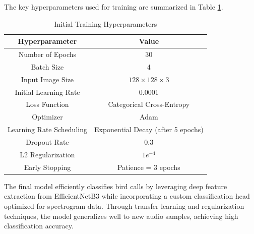 \begin{itemize}
            The key hyperparameters used for training are summarized in Table \ref{tab:training_hyperparameters}.
            \begin{table}[h]
                  \centering
                  \caption{Initial Training Hyperparameters}
                  \label{tab:training_hyperparameters}
                  \begin{tabular}{|c|c|}
                  \hline
                  \textbf{Hyperparameter} & \textbf{Value} \\
                  \hline
                  Number of Epochs & 30 \\
                  \hline
                  Batch Size & 4 \\
                  \hline
                  Input Image Size & \(128 \times 128 \times 3\) \\
                  \hline
                  Initial Learning Rate & 0.0001 \\
                  \hline
                  Loss Function & Categorical Cross-Entropy \\
                  \hline
                  Optimizer & Adam \\
                  \hline
                  Learning Rate Scheduling & Exponential Decay (after 5 epochs) \\
                  \hline
                  Dropout Rate & 0.3 \\
                  \hline
                  L2 Regularization & \(1e^{-4}\) \\
                  \hline
                  Early Stopping & Patience = 3 epochs \\
                  \hline
                  \end{tabular}
            \end{table}
            
            
            The final model efficiently classifies bird calls by leveraging deep feature extraction from EfficientNetB3 while incorporating a custom classification head optimized for spectrogram data. Through transfer learning and regularization techniques, the model generalizes well to new audio samples, achieving high classification accuracy.
      \end{itemize}



